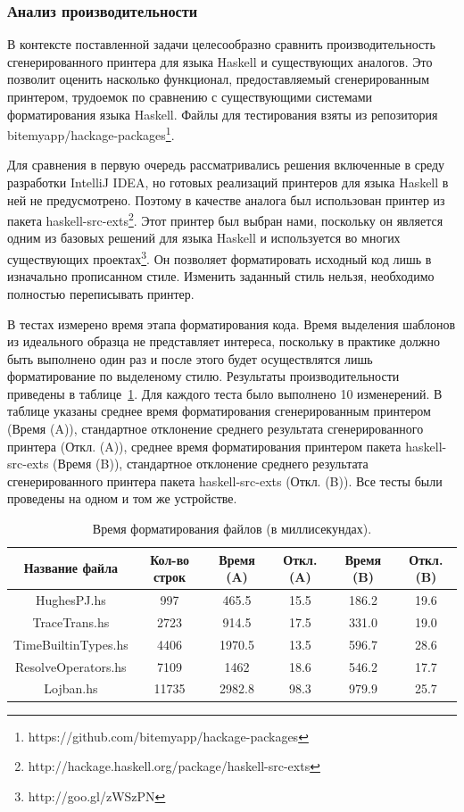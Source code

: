 \documentclass{matmex-diploma}
\begin{document}
\subsubsection{Анализ производительности}

В контексте поставленной задачи целесообразно сравнить производительность сгенерированного принтера для языка Haskell и существующих аналогов. Это позволит оценить насколько функционал, предоставляемый сгенерированным принтером, трудоемок по сравнению с существующими системами форматирования языка Haskell. Файлы для тестирования взяты из репозитория bitemyapp/hackage-packages\footnote{https://github.com/bitemyapp/hackage-packages}. 

Для сравнения в первую очередь рассматривались решения включенные в среду разработки IntelliJ IDEA, но готовых реализаций принтеров для языка Haskell в ней не предусмотрено. Поэтому в качестве аналога был использован принтер из пакета haskell-src-exts\footnote{http://hackage.haskell.org/package/haskell-src-exts}. Этот принтер был выбран нами, поскольку он является одним из базовых решений для языка Haskell и используется во многих существующих проектах\footnote{http://goo.gl/zWSzPN}. Он позволяет форматировать исходный код лишь в изначально прописанном стиле. Изменить заданный стиль нельзя, необходимо полностью переписывать принтер. 

В тестах измерено время этапа форматирования кода. Время выделения шаблонов из идеального образца не представляет интереса, поскольку в практике должно быть выполнено один раз и после этого будет осуществлятся лишь форматирование по выделеному стилю. Результаты производительности приведены в
таблице~\ref{HaskellPerformanceTbl}. Для каждого теста было выполнено 10 изменерений. В таблице указаны среднее время форматирования сгенерированным принтером (Время (A)), стандартное отклонение среднего результата сгенерированного принтера (Откл. (A)), среднее время форматирования принтером пакета haskell-src-exts (Время (B)), стандартное отклонение среднего результата сгенерированного принтера пакета haskell-src-exts (Откл. (B)). Все тесты были проведены на одном и том же устройстве.

\begin{table}[H]
\begin{center}
\begin{tabular}{|c|c|c|c|c|c|}
\hline
Название файла & Кол-во строк & Время (A) & Откл. (A) & Время (B) & Откл. (B)\\
\hline
HughesPJ.hs & 997 & 465.5 & 15.5 & 186.2 & 19.6\\
TraceTrans.hs & 2723 & 914.5 & 17.5 & 331.0 & 19.0\\
TimeBuiltinTypes.hs & 4406 & 1970.5 & 13.5 & 596.7 & 28.6\\
ResolveOperators.hs & 7109 & 1462 & 18.6 & 546.2 & 17.7\\
Lojban.hs & 11735 & 2982.8 & 98.3 & 979.9 & 25.7\\
\hline
\end{tabular}
\end{center}
\caption{\label{HaskellPerformanceTbl}Время форматирования файлов (в миллисекундах).}
\end{table} 
\end{document}
